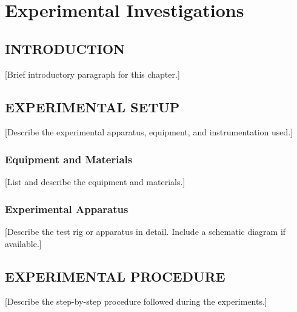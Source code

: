 \chapter{Experimental Investigations}

\section{INTRODUCTION}

[Brief introductory paragraph for this chapter.]

\section{EXPERIMENTAL SETUP}

[Describe the experimental apparatus, equipment, and
instrumentation used.]

\subsection{Equipment and Materials}

[List and describe the equipment and materials.]

\subsection{Experimental Apparatus}

[Describe the test rig or apparatus in detail. Include
a schematic diagram if available.]


\section{EXPERIMENTAL PROCEDURE}

[Describe the step-by-step procedure followed during the
experiments.]

